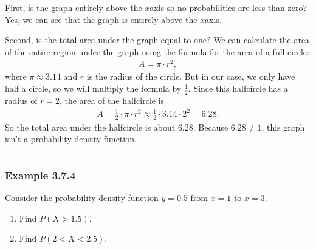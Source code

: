 \documentclass[letterpaper,10pt,english]{jupyterBook}
\begin{document}
\sphinxAtStartPar
First, is the graph entirely above the \(x\)\sphinxhyphen{}axis so no probabilities are less than zero? Yes, we can see that the graph is entirely above the \(x\)\sphinxhyphen{}axis.

\sphinxAtStartPar
Second, is the total area under the graph equal to one? We can calculate the area of the entire region under the graph using the formula for the area of a full circle:
\begin{equation*}
\begin{split} A = \pi \cdot r^2, \end{split}
\end{equation*}
\sphinxAtStartPar
where \(\pi \approx 3.14\) and \(r\) is the radius of the circle. But in our case, we only have half a circle, so we will multiply the formula by \(\frac{1}{2}\). Since this half\sphinxhyphen{}circle has a radius of \(r = 2\), the area of the half\sphinxhyphen{}circle is
\begin{equation*}
\begin{split} A = \frac{1}{2} \cdot \pi \cdot r^2 \approx \frac{1}{2} \cdot 3.14 \cdot 2^2 = 6.28. \end{split}
\end{equation*}
\sphinxAtStartPar
So the total area under the half\sphinxhyphen{}circle is about \(6.28\). Because \(6.28 \neq 1\), this graph isn’t a probability density function.


\bigskip\hrule\bigskip



\subsubsection{Example 3.7.4}
\label{\detokenize{Ch3 Probability/3.7 Continuous Probability Distributions:example-3-7-4}}
\sphinxAtStartPar
Consider the probability density function \(y = 0.5\) from \(x = 1\) to \(x = 3\).
\begin{enumerate}
%
\item {} 
\sphinxAtStartPar
Find \(P(X > 1.5)\).

\item {} 
\sphinxAtStartPar
Find \(P(2 < X < 2.5)\).

\end{enumerate}
\end{document}
